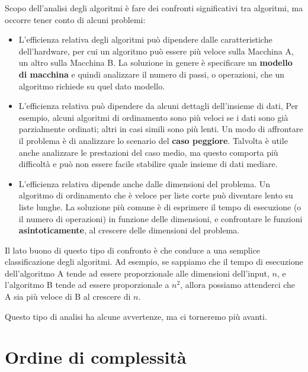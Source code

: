 \documentclass[10pt]{book}
\begin{document}
Scopo dell'analisi degli algoritmi è fare dei confronti significativi tra algoritmi, ma occorre tener conto di alcuni problemi:

\begin{itemize}

\item L'efficienza relativa degli algoritmi può dipendere dalle caratteristiche dell'hardware, per cui un algoritmo può essere più veloce sulla Macchina A, un altro sulla Macchina B. La soluzione in genere è specificare un
{\bf modello di macchina} e quindi analizzare il numero di passi, o operazioni, che un algoritmo richiede su quel dato modello.

\item L'efficienza relativa può dipendere da alcuni dettagli dell'insieme di dati, Per esempio, alcuni algoritmi di ordinamento sono più veloci se i dati sono già parzialmente ordinati; altri in casi simili sono più lenti. Un modo di affrontare il problema è di analizzare lo scenario del {\bf caso peggiore}. Talvolta è utile anche analizzare le prestazioni del caso medio, ma questo comporta più difficoltà e può non essere facile stabilire quale insieme di dati mediare.

\item L'efficienza relativa dipende anche dalle dimensioni del problema. Un algoritmo di ordinamento che è veloce per liste corte può diventare lento su liste lunghe. La soluzione più comune è di esprimere il tempo di esecuzione (o il numero di operazioni) in funzione delle dimensioni, e confrontare le funzioni {\bf asintoticamente}, al crescere delle dimensioni del problema.

\end{itemize}

Il lato buono di questo tipo di confronto è che conduce a una semplice classificazione degli algoritmi. Ad esempio, se sappiamo che il tempo di esecuzione dell'algoritmo A tende ad essere proporzionale alle dimensioni dell'input, $n$, e l'algoritmo B tende ad essere proporzionale a $n^2$, allora possiamo attenderci che A sia più veloce di B al crescere di $n$.

Questo tipo di analisi ha alcune avvertenze, ma ci torneremo più avanti.


\section{Ordine di complessità}
\end{document}
